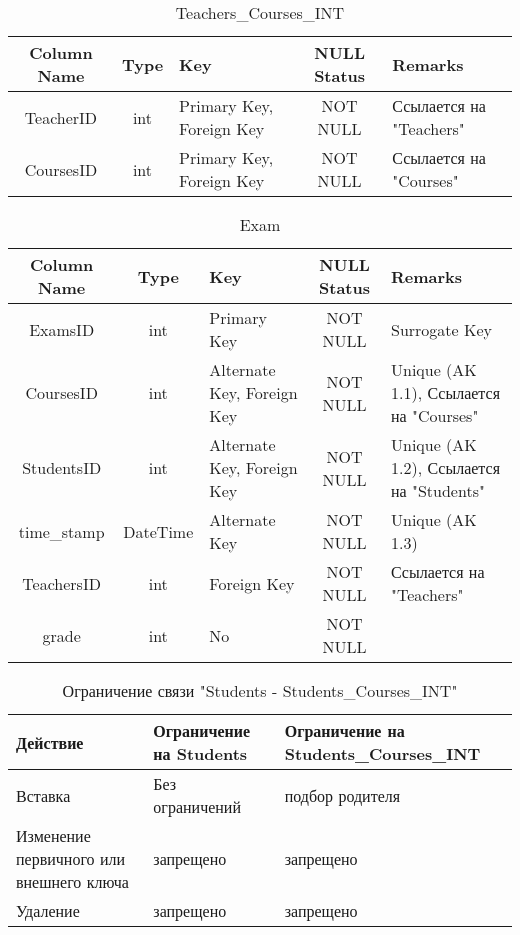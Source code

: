 \documentclass[a4paper, 14pt]{extarticle}
\begin{document}
\begin{table}[H]
\centering
\captionsetup{singlelinecheck=false, justification=raggedright}
\caption{Teachers\_Courses\_INT}
    \begin{tabular}
        {|c|c|p{3cm}|c|p{3cm}|}
        \hline
        Column Name & Type & Key & NULL Status  & Remarks \\
        \hline
        TeacherID & int & Primary Key, Foreign Key & NOT NULL & Ссылается на "Teachers" \\
        \hline
        CoursesID & int & Primary Key, Foreign Key & NOT NULL & Ссылается на "Courses" \\
    \hline
    \end{tabular}
\end{table}

\begin{table}[H]
\centering
\captionsetup{singlelinecheck=false, justification=raggedright}
\caption{Exam}
    \begin{tabular}
        {|c|c|p{3cm}|c|p{4cm}|}
        \hline
        Column Name & Type & Key & NULL Status  & Remarks \\
        \hline
        ExamsID & int & Primary Key & NOT NULL & Surrogate Key \\
        \hline
        CoursesID & int & Alternate Key, Foreign Key & NOT NULL & Unique (AK 1.1),  Ссылается на "Courses" \\
        \hline
        StudentsID & int & Alternate Key, Foreign Key & NOT NULL & Unique (AK 1.2),  Ссылается на "Students" \\
        \hline
        time\_stamp & DateTime & Alternate Key & NOT NULL & Unique (AK 1.3) \\
        \hline
        TeachersID & int & Foreign Key & NOT NULL &  Ссылается на "Teachers" \\
        \hline
        grade & int & No & NOT NULL &  \\
    \hline
    \end{tabular}
\end{table}

\begin{table}[H]
\centering
\captionsetup{singlelinecheck=false, justification=raggedright}
\caption{Ограничение связи "Students - Students\_Courses\_INT"}
    \begin{tabular}
        {|p{4cm}|p{5cm}|p{5cm}|}
        \hline
        Действие & Ограничение на Students & Ограничение на Students\_Courses\_INT \\
        \hline
        Вставка & Без ограничений &  подбор родителя \\
        \hline
        Изменение первичного или внешнего ключа & запрещено & запрещено \\
        \hline
        Удаление & запрещено & запрещено \\
    \hline
    \end{tabular}
\end{table}
\end{document}
